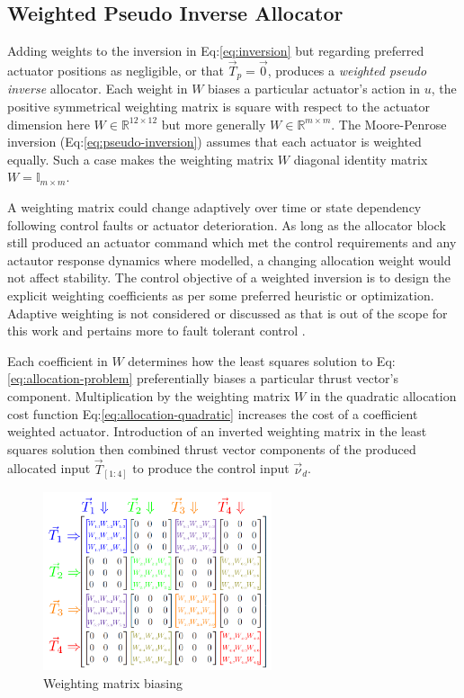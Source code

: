 \subsection{Weighted Pseudo Inverse Allocator}
\label{subsec:allocation.allocators.weightedinverse}
Adding weights to the inversion in Eq:\ref{eq:inversion} but regarding preferred actuator positions as negligible, or that $\vec{T}_p=\vec{0}$, produces a \emph{weighted pseudo inverse} allocator. Each weight in $W$ biases a particular actuator's action in $u$, the positive symmetrical weighting matrix is square with respect to the actuator dimension here $W\in\mathbb{R}^{12\times 12}$ but more generally $W\in\mathbb{R}^{m\times m}$. The Moore-Penrose inversion (Eq:\ref{eq:pseudo-inversion}) assumes that each actuator is weighted equally. Such a case makes the weighting matrix $W$ diagonal identity matrix $W = \mathbb{I}_{m\times m}$. 
\par
A weighting matrix could change adaptively over time or state dependency following control faults or actuator deterioration. As long as the allocator block still produced an actuator command which met the control requirements and any actautor response dynamics where modelled, a changing allocation weight would not affect stability. The control objective of a weighted inversion is to design the explicit weighting coefficients as per some preferred heuristic or optimization. Adaptive weighting is not considered or discussed as that is out of the scope for this work and pertains more to fault tolerant control \cite{FTCallocation}.
\par
Each coefficient in $W$ determines how the least squares solution to Eq:\ref{eq:allocation-problem} preferentially biases a particular thrust vector's component. Multiplication by the weighting matrix $W$ in the quadratic allocation cost function Eq:\ref{eq:allocation-quadratic} increases the cost of a coefficient weighted actuator. Introduction of an inverted weighting matrix in the least squares solution then combined thrust vector components of the produced allocated input $\vec{T}_{[1:4]}$ to produce the control input $\vec{\nu}_d$. 
\begin{figure}[htbp]
\vspace{-6pt}
\centering
\includegraphics[width=0.6\textwidth]{figs/weighted-matrix}
\vspace{-6pt}
\caption{Weighting matrix biasing}
\label{fig:weighted-matrix-allocation}
\vspace{-6pt}
\end{figure}
